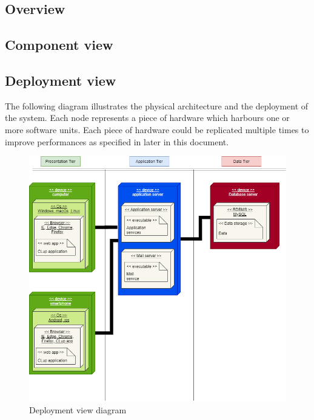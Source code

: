 \subsection{Overview}
\subsection{Component view}
\subsection{Deployment view}

The following diagram illustrates the physical architecture and the
deployment of the system.
Each node represents a piece of hardware which harbours one or more software units.
Each piece of hardware could be replicated multiple times to improve performances as  specified in later in this document.

\begin{figure}[H]
    \centering
    \hspace*{-3.5cm}
    \includegraphics[height=0.7\textwidth]{Images/TierDiagram.png}
    \caption{Deployment view diagram}
\end{figure}

